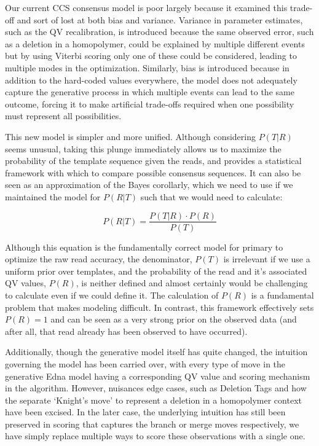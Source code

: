 \documentclass[fleqn,10pt]{SelfArx} %
\begin{document}
Our current CCS consensus model is poor largely because it examined this trade-off and sort of lost at both bias and variance.  Variance in parameter estimates, such as the QV recalibration, is introduced because the same observed error, such as a deletion in a homopolymer, could be explained by multiple different events but by using Viterbi scoring only one of these could be considered, leading to multiple modes in the optimization.  Similarly, bias is introduced because in addition to the hard-coded values everywhere, the model does not adequately capture the generative process in which multiple events can lead to the same outcome, forcing it to make artificial trade-offs required when one possibility must represent all possibilities.

This new model is simpler and more unified.  Although considering $P(T|R)$ seems unusual, taking this plunge immediately allows us to maximize the probability of the template sequence given the reads, and provides a statistical framework with which to compare possible consensus sequences.  It can also be seen as an approximation of the Bayes corollarly, which we need to use if we maintained the model for $P(R|T)$ such that we would need to calculate:

\begin{dmath}
P(R|T) = \frac{P(T|R) \cdot P(R)}{P(T)}
\end{dmath}

Although this equation is the fundamentally correct model for primary to optimize the raw read accuracy, the denominator, $P(T)$ is irrelevant if we use a uniform prior over templates, and the probability of the read and it's associated QV values, $P(R)$, is neither defined and almost certainly would be challenging to calculate even if we could define it.  The calculation of $P(R)$ is a fundamental problem that makes modeling difficult.  In contrast, this framework effectively sets $P(R) = 1$ and can be seen as a very strong prior on the observed data (and after all, that read already has been observed to have occurred).  

  Additionally, though the generative model itself has quite changed, the intuition governing the model has been carried over, with every type of move in the generative Edna model having a corresponding QV value and scoring mechanism in the algorithm.  However, nuisances edge cases, such as Deletion Tags and how the separate  `Knight's move' to represent a deletion in a homopolymer context have been excised.   In the later case, the underlying intuition has still been preserved in scoring that captures the branch or merge moves respectively, we have simply replace multiple ways to score these observations with a single one.
\end{document}
